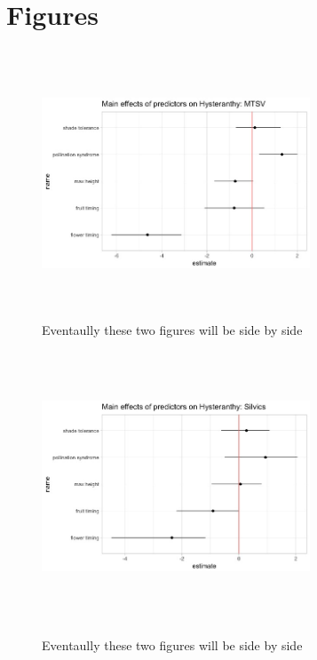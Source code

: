 \documentclass{article}\usepackage[]{graphicx}\usepackage[]{color}
\begin{document}
\section*{Figures}
\begin{figure}[h!]
\includegraphics[width=8cm, height=8cm]{../figure/booteffect_MTSV.jpeg}\\
\caption{Eventaully these two figures will be side by side}
\includegraphics[width=8cm, height=8cm]{../figure/booteffect_sil.jpeg}\\
\caption{Eventaully these two figures will be side by side}
\end{figure}
\end{document}
